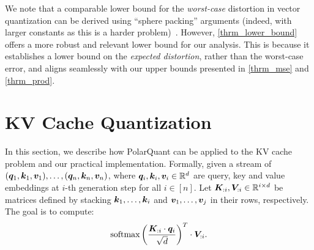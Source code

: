 \documentclass[11pt]{article}
\begin{document}
We note that a comparable lower bound for the \emph{worst-case} distortion in vector quantization can be derived using ``sphere packing'' arguments (indeed, with larger constants as this is a harder problem)~\cite{gersho1982structure}.
However, \cref{thrm_lower_bound} offers a more robust and relevant lower bound for our analysis. 
This is because it establishes a lower bound on the \emph{expected distortion}, rather than the worst-case error, and aligns seamlessly with our upper bounds presented in \cref{thrm_mse} and \cref{thrm_prod}.




\iffalse
\section{KV Cache Quantization} \label{sec:polar-quant-kv}

In this section, we describe how PolarQuant can be applied to the KV cache problem and our practical implementation. Formally, given a stream of $({\bm q}_1,{\bm k}_1,{\bm v}_1),\ldots,({\bm q}_n,{\bm k}_n,{\bm v}_n)$, where ${\bm q}_i,{\bm k}_i,{\bm v}_i \in \mathbb{R}^{d}$ are query, key and value embeddings at $i$-th generation step for all $i \in [n]$. Let ${\bm K}_{:i}, {\bm V}_{:i} \in \mathbb{R}^{i \times d}$ be matrices defined by stacking ${\bm k}_1, \dots, {\bm k}_i$ and ${\bm v}_1, \dots, {\bm v}_j$ in their rows, respectively. The goal is to compute:
\begin{equation}\label{eq:attn-def}
    \text{softmax}\left(\frac{{\bm K}_{:i} \cdot {\bm q}_i}{\sqrt{d}}\right)^T\cdot {\bm V}_{:i}. 
\end{equation} 
\end{document}
